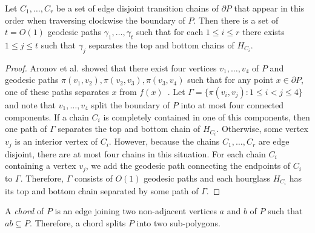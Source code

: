\documentclass[a4paper,UKenglish]{lipics}
\newcommand{\ff}[1]{\ensuremath{f(#1)}}
\newcommand{\p}[2]{\ensuremath{\pi(#1, #2)}}
\begin{document}
\begin{lemma}\label{lemma:Split paths}
Let $C_1, \ldots, C_r$ be a set of edge disjoint transition chains of $\partial P$ that appear in this order when traversing clockwise the boundary of $P$. Then there is a set of $t = O(1)$ geodesic paths $\gamma_1, \ldots, \gamma_t$ such that for each $1\leq i\leq r$ there exists $1\leq j\leq t$ such that $\gamma_j$ separates the top and bottom chains of $H_{C_i}$.
\end{lemma}
\begin{proof}
Aronov et al. showed that there exist four vertices $v_1, \ldots, v_4$ of $P$ and geodesic paths $\p{v_1}{v_2}, \p{v_2}{v_3}, \p{v_3}{v_4}$ such that for any point $x\in \partial P$, one of these paths separates $x$ from $\ff{x}$~\cite[Lemma 2.7.6]{aronov1993furthest}.
Let $\Gamma= \{\p{v_i}{v_j} : 1\leq i < j\leq 4\}$ and note that $v_1, \ldots, v_4$ split the boundary of $P$ into at most four connected components.
If a chain $C_i$ is completely contained in one of this components, then one path of $\Gamma$ separates the top and bottom chain of $H_{C_i}$. Otherwise, some vertex $v_j$ is an interior vertex of $C_i$. However, because the chains $C_1, \ldots, C_r$ are edge disjoint, there are at most four chains in this situation. 
For each chain $C_i$ containing a vertex $v_j$, we add the geodesic path connecting the endpoints of $C_i$ to $\Gamma$.
Therefore, $\Gamma$ consists of $O(1)$ geodesic paths and each hourglass $H_{C_i}$ has its top and bottom chain separated by some path of $\Gamma$.
\end{proof}

A \emph{chord} of $P$ is an edge joining two non-adjacent vertices $a$ and $b$ of $P$ such that $ab\subseteq P$. Therefore, a chord splits $P$ into two sub-polygons.
\end{document}
